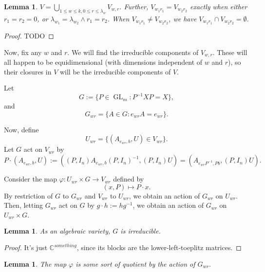 \documentclass[12pt,psamsfonts]{article}
\DeclareMathOperator{\GL}{GL}
\newtheorem{lemma}[theorem]{Lemma}
\begin{document}
\begin{lemma}
    \(V = \bigcup_{1 \leq w \leq k, 0 \leq r \leq \lambda_{w}} V_{w,r}\).
    Further, \(V_{w_1r_1} = V_{w_2r_2}\) exactly when either \(r_1 = r_2 = 0\), or \(\lambda_{w_1} = \lambda_{w_2} \land r_1 = r_2\).
    When \(V_{w_1r_1} \neq V_{w_2r_2}\), we have \(V_{w_1r_1} \cap V_{w_2r_2} = \emptyset\).
\end{lemma}
\begin{proof}
    TODO
\end{proof}
Now, fix any \(w\) and \(r\).
We will find the irreducible components of \(V_{w,r}\).
These will all happen to be equidimensional (with dimensions independent of \(w\) and \(r\)), so their closures in \(V\) will be the irreducible components of \(V\).
\par Let 
\[G := \{P \in \GL_m : P^{-1} X P = X\},\]
and
\[G_{wr} = \{A \in G : e_{wr}A = e_{wr}\}.\]
\par Now, define 
\[U_{wr} = \{(A_{e_{wr}, b}, U) \in V_{wr}\}.\]
Let \(G\) act on \(V_{wr}\) by
\[P \cdot (A_{e_{wr},b}, U) := ((P, I_n) A_{e_{wr}, b} (P, I_n)^{-1}, (P, I_n)U) = (A_{e_{wr} P^{-1}, Pb}, (P, I_n) U).\]
\par Consider the map \(\varphi : U_{wr} \times G \to V_{wr}\) defined by
\[(x, P) \mapsto P \cdot x.\]
By restriction of \(G\) to \(G_{wr}\) and \(V_{wr}\) to \(U_{wr}\), we obtain an action of \(G_{wr}\) on \(U_{wr}\).
Then, letting \(G_{wr}\) act on \(G\) by \(g \cdot h := hg^{-1}\), we obtain an action of \(G_{wr}\) on \(U_{wr} \times G\).
\begin{lemma}
    As an algebraic variety, \(G\) is irreducible.
\end{lemma}
\begin{proof}
    It's just \(\mathbb{C}^{something}\), since its blocks are the lower-left-toeplitz matrices.
\end{proof}
\begin{lemma}
    The map \(\varphi\) is some sort of quotient by the action of \(G_{wr}\).
\end{lemma}
\end{document}

